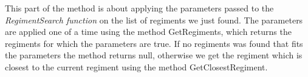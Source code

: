 	This part of the method is about applying the parameters passed to the {\it RegimentSearch function} on the list of regiments we just found. 
	The parameters are applied one of a time using the method GetRegiments, which returns the regiments for which the parameters are true. 
	If no regiments was found that fits the parameters the method returns null, otherwise we get the regiment which is closest to the current regiment 
	using the method GetClosestRegiment. 